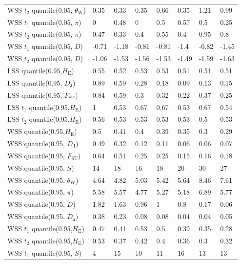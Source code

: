 \documentclass[a4paper, 12pt]{article}
\begin{document}
\begin{tiny}
\begin{longtable}{p{3.0cm}p{1.0cm}p{1.0cm}p{1.0cm}p{1.0cm}p{1.0cm}p{1.0cm}p{1.0cm}}
WSS $t_2$ quantile(0.05, $\theta_{\mathrm{W}}$) & 0.35 & 0.33 & 0.35 & 0.66 & 0.35 & 1.21 & 0.99 \\
WSS $t_1$ quantile(0.05, $\pi$) & 0 & 0.48 & 0 & 0.5 & 0.57 & 0.5 & 0.25 \\
WSS $t_2$ quantile(0.05, $\pi$) & 0.47 & 0.33 & 0.4 & 0.55 & 0.4 & 0.95 & 0.8 \\
WSS $t_1$ quantile(0.05, $D$) & -0.71 & -1.18 & -0.81 & -0.81 & -1.4 & -0.82 & -1.45 \\
WSS $t_2$ quantile(0.05, $D$) & -1.06 & -1.53 & -1.56 & -1.53 & -1.49 & -1.59 & -1.63 \\
LSS quantile(0.95,$H_{\mathrm{E}}$) & 0.55 & 0.52 & 0.53 & 0.53 & 0.51 & 0.51 & 0.51 \\
LSS quantile(0.95, $D_{\mathrm{J}}$) & 0.89 & 0.59 & 0.28 & 0.18 & 0.09 & 0.13 & 0.15 \\
LSS quantile(0.95, $F_{\mathrm{ST}}$) & 0.84 & 0.59 & 0.3 & 0.32 & 0.22 & 0.37 & 0.25 \\
LSS $t_1$ quantile(0.95,$H_{\mathrm{E}}$) & 1 & 0.53 & 0.67 & 0.67 & 0.53 & 0.67 & 0.54 \\
LSS $t_2$ quantile(0.95,$H_{\mathrm{E}}$) & 0.56 & 0.53 & 0.53 & 0.53 & 0.53 & 0.5 & 0.53 \\
WSS quantile(0.95,$H_{\mathrm{E}}$) & 0.5 & 0.41 & 0.4 & 0.39 & 0.35 & 0.3 & 0.29 \\
WSS quantile(0.95, $D_{\mathrm{J}}$) & 0.49 & 0.32 & 0.12 & 0.11 & 0.06 & 0.06 & 0.07 \\
WSS quantile(0.95, $F_{\mathrm{ST}}$) & 0.64 & 0.51 & 0.25 & 0.25 & 0.15 & 0.16 & 0.18 \\
WSS quantile(0.95, $S$) & 14 & 18 & 16 & 18 & 20 & 30 & 27 \\
WSS quantile(0.95, $\theta_{\mathrm{W}}$) & 4.64 & 4.82 & 5.03 & 5.42 & 5.64 & 8.46 & 7.61 \\
WSS quantile(0.95, $\pi$) & 5.58 & 5.57 & 4.77 & 5.27 & 5.18 & 6.89 & 5.77 \\
WSS quantile(0.95, $D$) & 1.82 & 1.63 & 0.96 & 1 & 0.8 & 0.17 & 0.06 \\
WSS quantile(0.95, $D_{\mathrm{a}}$) & 0.38 & 0.23 & 0.08 & 0.08 & 0.04 & 0.04 & 0.05 \\
WSS $t_1$ quantile(0.95,$H_{\mathrm{E}}$) & 0.47 & 0.41 & 0.53 & 0.5 & 0.39 & 0.35 & 0.28 \\
WSS $t_2$ quantile(0.95,$H_{\mathrm{E}}$) & 0.53 & 0.37 & 0.42 & 0.4 & 0.36 & 0.3 & 0.32 \\
WSS $t_1$ quantile(0.95, $S$) & 4 & 15 & 10 & 11 & 16 & 13 & 13 \\

\end{longtable}
\end{tiny}
\end{document}
